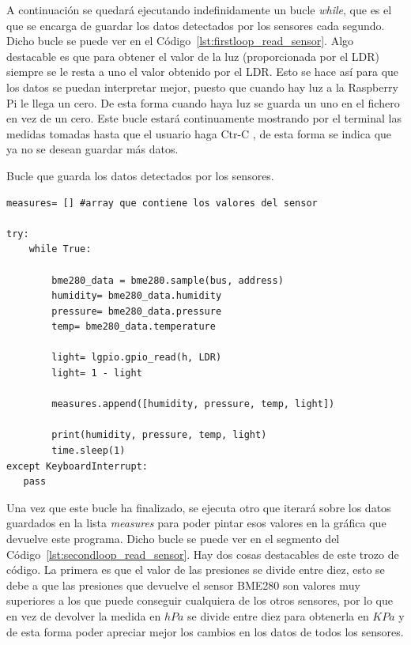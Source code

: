 \documentclass[a4paper, 12pt]{book}
\begin{document}
A continuación se quedará ejecutando indefinidamente un bucle \textit{while}, que es el que se encarga de guardar los datos detectados por los sensores cada segundo. Dicho bucle se puede ver en el Código~\ref{lst:firstloop_read_sensor}. Algo destacable es que para obtener el valor de la luz (proporcionada por el LDR) siempre se le resta a uno el valor obtenido por el LDR. Esto se hace así para que los datos se puedan interpretar mejor, puesto que cuando hay luz a la Raspberry Pi le llega un cero. De esta forma cuando haya luz se guarda un uno en el fichero en vez de un cero. 
Este bucle estará continuamente mostrando por el terminal las medidas tomadas hasta que el usuario haga Ctr-C , de esta forma se indica que ya no se desean guardar más datos.

\begin{listing}[htb]
    \caption{Bucle que guarda los datos detectados por los sensores.}{}
    \label{lst:firstloop_read_sensor}
    \begin{verbatim}
measures= [] #array que contiene los valores del sensor

try:
    while True:

        bme280_data = bme280.sample(bus, address)
        humidity= bme280_data.humidity
        pressure= bme280_data.pressure
        temp= bme280_data.temperature
        
        light= lgpio.gpio_read(h, LDR)
        light= 1 - light
        
        measures.append([humidity, pressure, temp, light])
        
        print(humidity, pressure, temp, light)
        time.sleep(1)
except KeyboardInterrupt:
   pass  
    \end{verbatim}
\end{listing}

Una vez que este bucle ha finalizado, se ejecuta otro que iterará sobre los datos guardados en la lista \textit{measures} para poder pintar esos valores en la gráfica que devuelve este programa. Dicho bucle se puede ver en el segmento del Código~\ref{lst:secondloop_read_sensor}. Hay dos cosas destacables de este trozo de código. La primera es que el valor de las presiones se divide entre diez, esto se debe a que las presiones que devuelve el sensor BME280 son valores muy superiores a los que puede conseguir cualquiera de los otros sensores, por lo que en vez de devolver la medida en $hPa$ se divide entre diez para obtenerla en $KPa$ y de esta forma poder apreciar mejor los cambios en los datos de todos los sensores.
\end{document}

